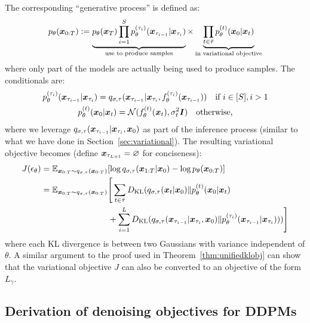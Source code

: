 The corresponding ``generative process'' is defined as:
\begin{align}
    p_\theta({\bm{x}}_{0:T}) := \underbrace{p_\theta({\bm{x}}_T) \prod_{i=1}^{S} p^{(\tau_i)}_\theta({\bm{x}}_{\tau_{i-1}} | {\bm{x}}_{\tau_i})}_{\text{use to produce samples}} \times \underbrace{\prod_{t \in \bar{\tau}} p_\theta^{(t)}({\bm{x}}_{0} | {\bm{x}}_t)}_{\text{in variational objective}} 
\end{align}
where only part of the models are actually being used to produce samples. The conditionals are:
\begin{gather}
    p_\theta^{(\tau_i)}({\bm{x}}_{\tau_{i-1}} | {\bm{x}}_{\tau_i}) = q_{\sigma, \tau}({\bm{x}}_{\tau_{i-1}} | {\bm{x}}_{\tau_i}, f_{\theta}^{(\tau_i)}({\bm{x}}_{\tau_{i-1}})) \quad  \text{if} \ i \in [S], i > 1 \\
     p_\theta^{(t)}({\bm{x}}_0 | {\bm{x}}_{t}) = {\mathcal{N}}(f_\theta^{(t)}({\bm{x}}_t), \sigma_t^2 {\bm{I}})  \quad \text{otherwise,}
\end{gather}
where we leverage $q_{\sigma, \tau}({\bm{x}}_{\tau_{i-1}} | {\bm{x}}_{\tau_{i}}, {\bm{x}}_0)$ as part of the inference process (similar to what we have done in Section~\ref{sec:variational}). The resulting variational objective becomes (define ${\bm{x}}_{\tau_{L+1}} = \varnothing$ for conciseness):
\begin{align}
   J(\epsilon_\theta) & = {\mathbb{E}}_{{\bm{x}}_{0:T} \sim q_{\sigma, \tau}({\bm{x}}_{0:T})}[ \log q_{\sigma, \tau}({\bm{x}}_{1:T} | {\bm{x}}_0) - \log p_\theta({\bm{x}}_{0:T})] \\
   & ={\mathbb{E}}_{{\bm{x}}_{0:T} \sim q_{\sigma, \tau}({\bm{x}}_{0:T})}\Bigg[ \sum_{t \in \bar{\tau}} D_{\mathrm{KL}}(q_{\sigma, \tau}({\bm{x}}_{t} | {\bm{x}}_0) \Vert p_\theta^{(t)}({\bm{x}}_0 | {\bm{x}}_{t}) \\
   & \qquad \qquad \qquad \qquad + \sum_{i=1}^{L} D_{\mathrm{KL}}(q_{\sigma, \tau}({\bm{x}}_{\tau_{i-1}} | {\bm{x}}_{\tau_{i}}, {\bm{x}}_0) \Vert p_\theta^{(\tau_i)}({\bm{x}}_{\tau_{i-1}} | {\bm{x}}_{\tau_i})) ) \Bigg] \nonumber
\end{align}
where each KL divergence is between two Gaussians with variance independent of $\theta$. A similar argument to the proof used in Theorem~\ref{thm:unifiedklobj} can show that the variational objective $J$ can also be converted to an objective of the form $L_\gamma$.




\subsection{Derivation of denoising objectives for DDPMs}
\label{app:ddpm}


